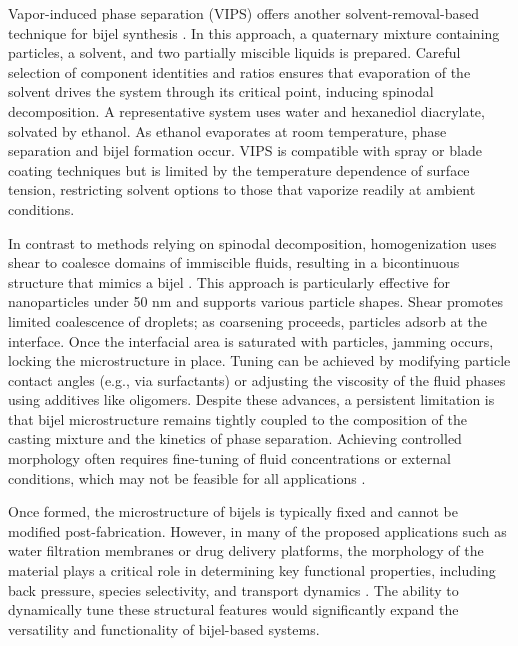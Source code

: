 Vapor-induced phase separation (VIPS) offers another solvent-removal-based technique for bijel synthesis \cite{wang_scalable_2020}. In this approach, a quaternary mixture containing particles, a solvent, 
and two partially miscible liquids is prepared. Careful selection of component identities and ratios ensures that evaporation of the solvent drives the system through its critical point, inducing spinodal 
decomposition. A representative system uses water and hexanediol diacrylate, solvated by ethanol. As ethanol evaporates at room temperature, phase separation and bijel formation occur. VIPS is compatible 
with spray or blade coating techniques but is limited by the temperature dependence of surface tension, restricting solvent options to those that vaporize readily at ambient conditions.

In contrast to methods relying on spinodal decomposition, homogenization uses shear to coalesce domains of immiscible fluids, resulting in a bicontinuous structure that mimics a bijel 
\cite{huang_bicontinuous_2017, cai_bijels_2017}. This approach is particularly effective for nanoparticles under 50 nm and supports various particle shapes. Shear promotes limited coalescence 
of droplets; as coarsening proceeds, particles adsorb at the interface. Once the interfacial area is saturated with particles, jamming occurs, locking the microstructure in place. Tuning can be 
achieved by modifying particle contact angles (e.g., via surfactants) or adjusting the viscosity of the fluid phases using additives like oligomers.
Despite these advances, a persistent limitation is that bijel microstructure remains tightly coupled to the composition of the casting mixture and the kinetics of phase separation. Achieving controlled 
morphology often requires fine-tuning of fluid concentrations or external conditions, which may not be feasible for all applications \cite{haase_continuous_2015, reeves_particle-size_2015}.

Once formed, the microstructure of bijels is typically fixed and cannot be modified post-fabrication. However, in many of the proposed applications such as water filtration membranes or drug delivery 
platforms, the morphology of the material plays a critical role in determining key functional properties, including back pressure, species selectivity, and transport dynamics 
\cite{vanoli_bijels_2022, thorson_bijel-templated_2019}. The ability to dynamically tune these structural features would significantly expand the versatility and 
functionality of bijel-based systems.

